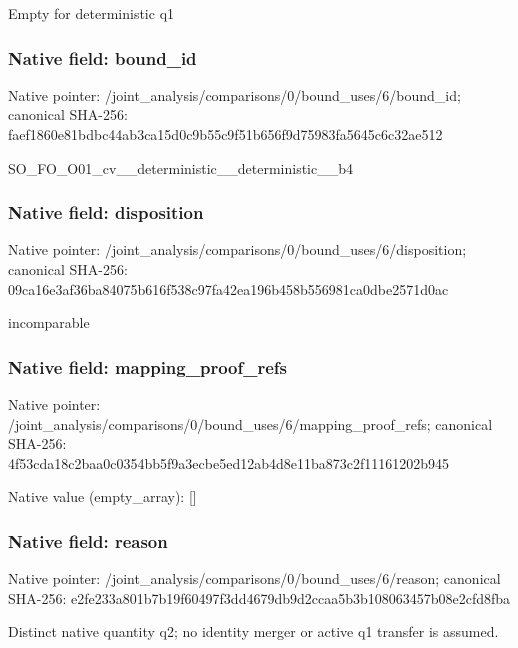 \documentclass[10pt,a4paper]{article}
\begin{document}
\begingroup\raggedright\sloppy Empty for deterministic q1\par\endgroup

\subsubsection{Native field: bound\_\allowbreak{}id}
Native pointer: /joint\_\allowbreak{}analysis/comparisons/0/bound\_\allowbreak{}uses/6/bound\_\allowbreak{}id; canonical SHA-256: faef1860e81bdbc44ab3ca15d0c9b55c9f51b656f9d75983fa5645c6c32ae512

\begingroup\raggedright\sloppy SO\_\allowbreak{}FO\_\allowbreak{}O01\_\allowbreak{}cv\_\allowbreak{}\_\allowbreak{}deterministic\_\allowbreak{}\_\allowbreak{}deterministic\_\allowbreak{}\_\allowbreak{}b4\par\endgroup

\subsubsection{Native field: disposition}
Native pointer: /joint\_\allowbreak{}analysis/comparisons/0/bound\_\allowbreak{}uses/6/disposition; canonical SHA-256: 09ca16e3af36ba84075b616f538c97fa42ea196b458b556981ca0dbe2571d0ac

\begingroup\raggedright\sloppy incomparable\par\endgroup

\subsubsection{Native field: mapping\_\allowbreak{}proof\_\allowbreak{}refs}
Native pointer: /joint\_\allowbreak{}analysis/comparisons/0/bound\_\allowbreak{}uses/6/mapping\_\allowbreak{}proof\_\allowbreak{}refs; canonical SHA-256: 4f53cda18c2baa0c0354bb5f9a3ecbe5ed12ab4d8e11ba873c2f11161202b945

Native value (empty\_\allowbreak{}array): []

\subsubsection{Native field: reason}
Native pointer: /joint\_\allowbreak{}analysis/comparisons/0/bound\_\allowbreak{}uses/6/reason; canonical SHA-256: e2fe233a801b7b19f60497f3dd4679db9d2ccaa5b3b108063457b08e2cfd8fba

\begingroup\raggedright\sloppy Distinct native quantity q2;\allowbreak{} no identity merger or active q1 transfer is assumed.\par\endgroup
\end{document}
